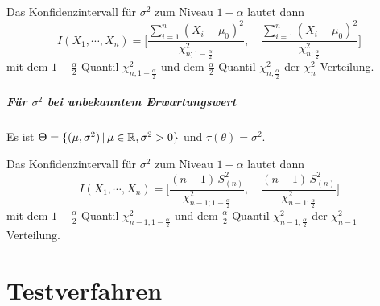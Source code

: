                 Das Konfidenzintervall für \(\sigma^2\) zum Niveau \( 1 - \alpha \) lautet dann
                \begin{equation*}
	                I(X_1, \cdots, X_n) = \Bigg[ \frac{\sum_{i = 1}^{n} (X_i - \mu_0)^2}{\chi_{n; 1 - \frac{\alpha}{2}}^2}, \quad \frac{\sum_{i = 1}^{n} (X_i - \mu_0)^2}{\chi_{n; \frac{\alpha}{2}}^2} \Bigg]
                \end{equation*}
                mit dem \( 1-\frac{\alpha}{2} \)-Quantil \( \chi_{n; 1 - \frac{\alpha}{2}}^2 \) und dem \( \frac{\alpha}{2} \)-Quantil \( \chi_{n; \frac{\alpha}{2}}^2 \) der \( \chi_n^2 \)-Verteilung.

            \paragraph{Für \(\sigma^2\) bei unbekanntem Erwartungswert}
                Es ist \( \Theta = \{ (\mu, \sigma^2) \,\vert\, \mu \in \mathbb{R}, \sigma^2 > 0 \} \) und \( \tau(\theta) = \sigma^2 \).
                
                Das Konfidenzintervall für \(\sigma^2\) zum Niveau \( 1 - \alpha \) lautet dann
                \begin{equation*}
	                I(X_1, \cdots, X_n) = \Bigg[ \frac{(n - 1) \, S_{(n)}^2}{\chi_{n - 1; 1 - \frac{\alpha}{2}}^2}, \quad \frac{(n - 1) \, S_{(n)}^2}{\chi_{n - 1; \frac{\alpha}{2}}^2} \Bigg]
                \end{equation*}
                mit dem \( 1-\frac{\alpha}{2} \)-Quantil \( \chi_{n-1; 1 - \frac{\alpha}{2}}^2 \) und dem \( \frac{\alpha}{2} \)-Quantil \( \chi_{n-1; \frac{\alpha}{2}}^2 \) der \( \chi_{n-1}^2 \)-Verteilung.

\chapter{Testverfahren}

